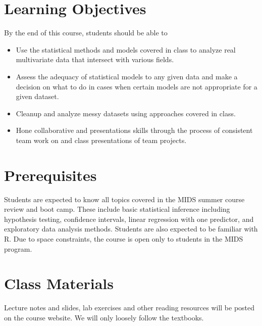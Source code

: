 \documentclass[11pt, a4paper]{article}
\begin{document}
\section{Learning Objectives}
By the end of this course, students should be able to
\begin{itemize}[label= {\color{darkblue}{\ArrowBoldRightStrobe}}]
	\item Use the statistical methods and models covered in class to analyze real multivariate data that intersect with various fields. 
	\item Assess the adequacy of statistical models to any given data and make a decision on what to do in cases when certain models are not appropriate for a given dataset.
	\item Cleanup and analyze messy datasets using approaches covered in class.
	\item Hone collaborative and presentations skills through the process of consistent team work on and class presentations of team projects.
\end{itemize}



\section{Prerequisites}
Students are expected to know all topics covered in the MIDS summer course review and boot camp. These include basic statistical inference including hypothesis testing, confidence intervals, linear regression with one predictor, and exploratory data analysis methods. Students are also expected to be familiar with \textsf{R}. Due to space constraints, the course is open only to students in the MIDS program.


\section{Class Materials}
Lecture notes and slides, lab exercises and other reading resources will be posted on the course website. We will only loosely follow the textbooks.
\end{document}
